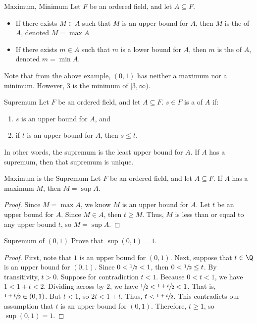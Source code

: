 \begin{dfnbox}{Maximum, Minimum}{}
    Let $F$ be an ordered field, and let $A \subseteq F$.
    \begin{itemize}[noitemsep]
        \item If there exists $M \in A$ such that $M$ is an upper bound for $A$, then $M$ is the  of $A$, denoted $M = \max A$
        \item If there exists $m \in A$ such that $m$ is a lower bound for $A$, then $m$ is the  of $A$, denoted $m = \min A$.
    \end{itemize}
\end{dfnbox}

Note that from the above example, $(0,1)$ has neither a maximum nor a minimum. However, 3 is the minimum of $[3,\infty)$.

\begin{dfnbox}{Supremum}{}
    Let $F$ be an ordered field, and let $A \subseteq F$. $s \in F$ is a  of $A$ if:
    \begin{enumerate}
        \item $s$ is an upper bound for $A$, and
        \item if $t$ is an upper bound for $A$, then $s \leq t$.
    \end{enumerate}
\end{dfnbox}

In other words, the supremum is the least upper bound for $A$. If $A$ has a supremum, then that supremum is unique. 

\begin{thmbox}{Maximum is the Supremum}{}
    Let $F$ be an ordered field, and let $A \subseteq F$. If $A$ has a maximum $M$, then $M = \sup A$.
    \tcblower
    \begin{proof}
        Since $M = \max A$, we know $M$ is an upper bound for $A$. Let $t$ be an upper bound for $A$. Since $M \in A$, then $t \geq M$. Thus, $M$ is less than or equal to any upper bound $t$, so $M = \sup A$.
    \end{proof}
\end{thmbox}

\begin{exbox}{Supremum of $(0,1)$}{}
    Prove that $\sup (0,1) = 1$.
    \tcblower
    \begin{proof}
        First, note that $1$ is an upper bound for $(0,1)$. Next, suppose that $t \in \Q$ is an upper bound for $(0,1)$. Since $0 < \sfrac{1}{2} < 1$, then $0 < \sfrac{1}{2} \leq t$. By transitivity, $t > 0$. Suppose for contradiction $t < 1$. Because $0 < t < 1$, we have $1 < 1 + t < 2$. Dividing across by $2$, we have $\sfrac{1}{2} < \sfrac{1+t}{2} < 1$. That is, $\sfrac{1+t}{2} \in (0,1)$. But $t < 1$, so $2t < 1+t$. Thus, $t < \sfrac{1+t}{2}$. This contradicts our assumption that $t$ is an upper bound for $(0,1)$. Therefore, $t \geq 1$, so $\sup (0,1) = 1$.
    \end{proof}
\end{exbox}

